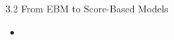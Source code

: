 \begin{frame}{3.2 From EBM to Score-Based Models}
    \begin{itemize}
        \item
    \end{itemize}
\end{frame}
